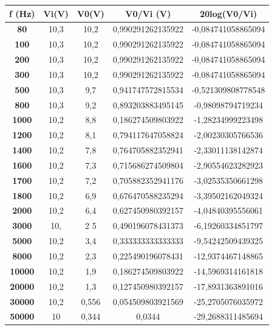 \documentclass[paper=a4, fontsize=11pt]{scrartcl} %
\numberwithin{equation}{section} %
\numberwithin{figure}{section} %
\numberwithin{table}{section} %
\begin{document}
\begin{table}[H]
	\centering
	\begin{tabular}{|c|c|c|c|c|}
		\hline
			\textbf{f (Hz)} & \textbf{Vi(V)} & \textbf{V0(V)} & \textbf{V0/Vi (V)} & \textbf{20log(V0/Vi)} \\
		\hline 
			\textbf{80} &  10,3    & 10,2    & 0,990291262135922  &-0,084741058865094 \\
			\textbf{100} & 10,3    & 10,2    & 0,990291262135922  &-0,084741058865094 \\
			\textbf{200} & 10,3    & 10,2    & 0,990291262135922  &-0,084741058865094 \\
			\textbf{300} & 10,3    & 10,2    & 0,990291262135922  &-0,084741058865094 \\
			\textbf{500} & 10,3    & 9,7 & 0,941747572815534  &-0,521309808778548 \\
			\textbf{800} & 10,3    & 9,2 & 0,893203883495145  &-0,98098794719234 \\
			\textbf{1000} &    10,2    & 8,8 & 0,186274509803922  &-1,28234999223498 \\
			\textbf{1200} &    10,2    & 8,1 & 0,794117647058824  &-2,00230305766536 \\
			\textbf{1400} &    10,2    & 7,8 & 0,764705882352941  &-2,33011138142874 \\
			\textbf{1600} &    10,2    & 7,3 & 0,715686274509804  &-2,90554623282923 \\
			\textbf{1700} &    10,2    & 7,2 & 0,705882352941176  &-3,02535350661298 \\
			\textbf{1800} &    10,2    & 6,9 & 0,676470588235294  &-3,39502162049324 \\
			\textbf{2000} &    10,2    & 6,4 & 0,627450980392157  &-4,04840395556061 \\
			\textbf{3000} &    10,& 2    5   & 0,490196078431373  &-6,19260334851797 \\
			\textbf{5000} &    10,2    & 3,4 & 0,333333333333333  &-9,54242509439325 \\
			\textbf{8000} &    10,2    & 2,3 & 0,225490196078431  &-12,9374467148865 \\
			\textbf{10000} &   10,2    & 1,9 & 0,186274509803922  &-14,5969314161818 \\
			\textbf{20000} &   10,2    & 1,3 & 0,127450980392157  &-17,8931363891016 \\
			\textbf{30000} &   10,2    & 0,556   & 0,054509803921569  &-25,2705076035972 \\
			\textbf{50000} &   10  & 0,344   & 0,0344 &-29,2688311485694 \\

\end{tabular}
\end{table}
\end{document}
